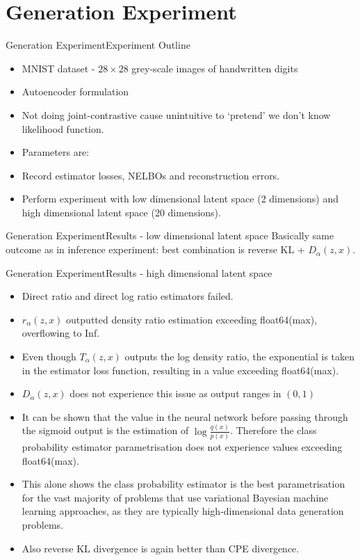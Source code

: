 \documentclass{beamer}
\begin{document}
\section{Generation Experiment}
\begin{frame}{Generation Experiment}{Experiment Outline}
\begin{itemize}
\item MNIST dataset - $28\times 28$ grey-scale images of handwritten digits
\item Autoencoder formulation
\item Not doing joint-contrastive cause unintuitive to `pretend' we don't know likelihood function.
\item Parameters are:
\item Record estimator losses, NELBOs and reconstruction errors.
\item Perform experiment with low dimensional latent space (2 dimensions) and high dimensional latent space (20 dimensions).
\end{itemize}
\end{frame}
\begin{frame}{Generation Experiment}{Results - low dimensional latent space}
Basically same outcome as in inference experiment: best combination is reverse KL + $D_\alpha(z,x)$.
\end{frame}
\begin{frame}{Generation Experiment}{Results - high dimensional latent space}
\begin{itemize}
\item Direct ratio and direct log ratio estimators failed.
\item $r_\alpha(z,x)$ outputted density ratio estimation exceeding float64(max), overflowing to Inf.
\item Even though $T_\alpha(z,x)$ outputs the log density ratio, the exponential is taken in the estimator loss function, resulting in a value exceeding float64(max).
\item $D_\alpha(z,x)$ does not experience this issue as output ranges in $(0,1)$
\item It can be shown that the value in the neural network before passing through the sigmoid output is the estimation of $\log \frac{q(x)}{p(x)}$. Therefore the class probability estimator parametrisation does not experience values exceeding float64(max).
\item This alone shows the class probability estimator is the best parametrisation for the vast majority of problems that use variational Bayesian machine learning approaches, as they are typically high-dimensional data generation problems.
\item Also reverse KL divergence is again better than CPE divergence.
\end{itemize}
\end{frame}
\end{document}
